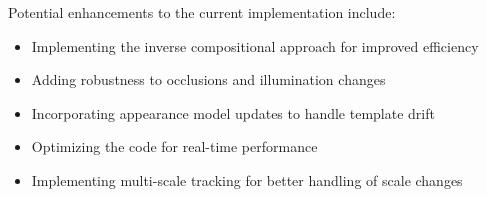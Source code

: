 \documentclass[12pt,a4paper]{article}
\begin{document}
Potential enhancements to the current implementation include:

\begin{itemize}
\item Implementing the inverse compositional approach for improved efficiency
\item Adding robustness to occlusions and illumination changes
\item Incorporating appearance model updates to handle template drift
\item Optimizing the code for real-time performance
\item Implementing multi-scale tracking for better handling of scale changes
\end{itemize}
\end{document}
